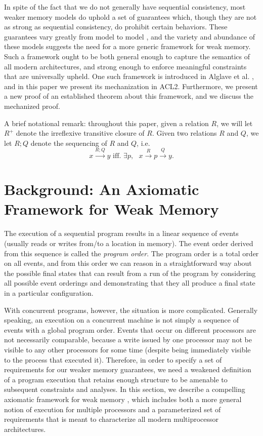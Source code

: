 \documentclass[]{eptcs}
\begin{document}
In spite of the fact that we do not generally have sequential consistency, most weaker memory models do uphold a set of guarantees which, though they are not as strong as sequential consistency, do prohibit certain behaviors. These guarantees vary greatly from model to model \cite{boudol09, chong08, owens09, sarkar11, sarkar09}, and the variety and abundance of these models suggests the need for a more generic framework for weak memory. Such a framework ought to be both general enough to capture the semantics of all modern architectures, and strong enough to enforce meaningful constraints that are universally upheld. One such framework is introduced in Alglave et al. \cite{alglave_cats}, and in this paper we present its mechanization in ACL2. Furthermore, we present a new proof of an established theorem about this framework, and we discuss the mechanized proof.

A brief notational remark: throughout this paper, given a relation $R$, we will let $R^+$ denote the irreflexive transitive closure of $R$. Given two relations $R$ and $Q$, we let $R;Q$ denote the sequencing of $R$ and $Q$, i.e.
\[
x \xrightarrow{R;Q} y \text{ iff. } \exists p, \text{ } x \xrightarrow{R} p \xrightarrow{Q} y.
\]

\section{Background: An Axiomatic Framework for Weak Memory}

The execution of a sequential program results in a linear sequence of events (usually reads or writes from/to a location in memory). The event order derived from this sequence is called the \emph{program order}. The program order is a total order on all events, and from this order we can reason in a straightforward way about the possible final states that can result from a run of the program by considering all possible event orderings and demonstrating that they all produce a final state in a particular configuration.

With concurrent programs, however, the situation is more complicated. Generally speaking, an execution on a concurrent machine is not simply a sequence of events with a global program order. Events that occur on different processors are not necessarily comparable, because a write issued by one processor may not be visible to any other processors for some time (despite being immediately visible to the process that executed it). Therefore, in order to specify a set of requirements for our weaker memory guarantees, we need a weakened definition of a program execution that retains enough structure to be amenable to subsequent constraints and analyses. In this section, we describe a compelling axiomatic framework for weak memory \cite{alglave_cats}, which includes both a more general notion of execution for multiple processors and a parameterized set of requirements that is meant to characterize all modern multiprocessor architectures.
\end{document}
